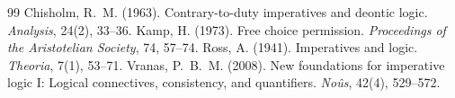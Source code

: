 \documentclass{situationist-preprint}
\begin{document}
\begin{thebibliography}{99}\small
{} Chisholm, R.~M. (1963). Contrary-to-duty imperatives and deontic logic. \emph{Analysis}, 24(2), 33--36.
 Kamp, H. (1973). Free choice permission. \emph{Proceedings of the Aristotelian Society}, 74, 57--74.
 Ross, A. (1941). Imperatives and logic. \emph{Theoria}, 7(1), 53--71.
 Vranas, P.~B.~M. (2008). New foundations for imperative logic I: Logical connectives, consistency, and quantifiers. \emph{Noûs}, 42(4), 529--572.
\end{thebibliography}
\end{document}
